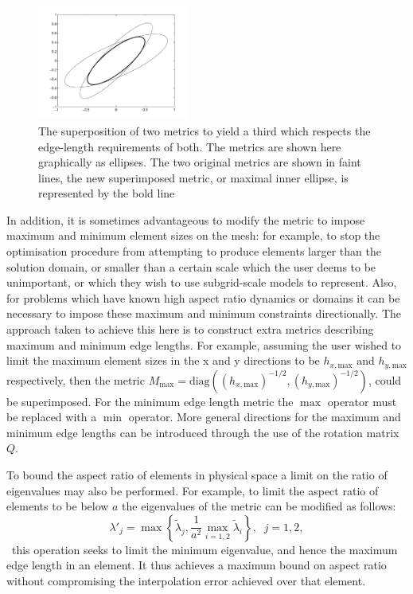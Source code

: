 \begin{figure}
\centering
\includegraphics[width=5cm]{images/MergedMetrics.pdf}
\caption{The superposition of two metrics to yield a third which
  respects the edge-length requirements of both.  The metrics are
  shown here graphically as ellipses. The two original metrics are
  shown in faint lines, the new superimposed metric, or maximal inner
  ellipse, is represented by the bold line}
\label{Fig:MergedMetrics}
\end{figure}

In addition, it is sometimes advantageous to modify the metric to
impose maximum and minimum element sizes on the mesh: for example, to
stop the optimisation procedure from attempting to produce elements
larger than the solution domain, or smaller than a certain scale which
the user deems to be unimportant, or which they wish to use
subgrid-scale models to represent. Also, for problems which have known
high aspect ratio dynamics or domains it can be necessary to impose
these maximum and minimum constraints directionally. The approach
taken to achieve this here is to construct extra metrics describing
maximum and minimum edge lengths. For example, assuming the user
wished to limit the maximum element sizes in the x and y directions to
be $h_{x,\textrm{max}}$ and $h_{y,\textrm{max}}$ respectively, then
the metric $M_{\textrm{max}} =
\textrm{diag}((h_{x,\textrm{max}})^{-1/2},(h_{y,\textrm{max}})^{-1/2})$,
could be superimposed.  For the minimum edge length metric the $\max$
operator must be replaced with a $\min$ operator. More general
directions for the maximum and minimum edge lengths can be introduced
through the use of the rotation matrix $Q$.

To bound the aspect ratio of elements in physical space a limit on the
ratio of eigenvalues may also be performed. For example, to limit the
aspect ratio of elements to be below $a$ the eigenvalues of the metric
can be modified as follows:
\begin{equation*}
{\lambda}'_j=\max\left\{\tilde{\lambda}_j,\frac{1}{a^2}\max_{i=1,2}\tilde{\lambda}_i\right\},\;\; j=1,2,
\end{equation*}
\ie\ this operation seeks to limit the minimum eigenvalue, and hence
the maximum edge length in an element.  It thus achieves a maximum
bound on aspect ratio without compromising the interpolation error
achieved over that element.

